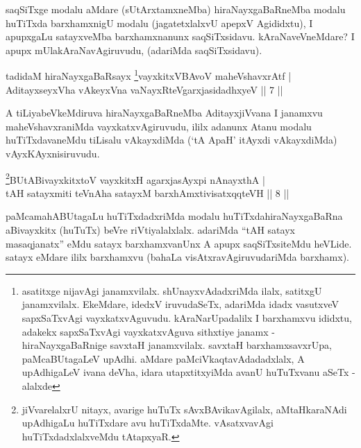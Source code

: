 \begin{artha}
saqSiTxge modalu aMdare (sUtArxtamxneMba) hiraNayxgaBaRneMba modalu huTiTxda barxhamxnigU modalu (jagatetxlalxvU apepxV Agididxtu), I apupxgaLu satayxveMba barxhamxnanunx saqSiTxsidavu. kAraNaveVneMdare? I apupx mUlakAraNavAgiruvudu, (adariMda saqSiTxsidavu).
\end{artha}


\begin{shl}
tadidaM hiraNayxgaBaRsayx \footnote{asatitxge nijavAgi janamxvilalx. shUnayxvAdadxriMda ilalx, satitxgU janamxvilalx. EkeMdare, idedxV iruvudaSeTx, adariMda idadx vasutxveV sapxSaTxvAgi vayxkatxvAguvudu. kAraNarUpadalilx I barxhamxvu ididxtu, adakekx sapxSaTxvAgi vayxkatxvAguva sithxtiye janamx - hiraNayxgaBaRnige savxtaH janamxvilalx. savxtaH barxhamxsavxrUpa, paMcaBUtagaLeV upAdhi. aMdare paMciVkaqtavAdadadxlalx, A upAdhigaLeV ivana deVha, idara utapxtitxyiMda avanU huTuTxvanu aSeTx - alalxde \mdash }vayxkitxVBAvoV maheVshavxrAtf | \\
AditayxseyxVha vAkeyxVna vaNayxRteV\s garxjasidadhxyeV \hfill ||  7 || 
\end{shl}

\begin{artha}
A tiLiyabeVkeMdiruva hiraNayxgaBaRneMba AditayxjiVvana I janamxvu maheVshavxraniMda vayxkatxvAgiruvudu, ililx adanunx Atanu modalu huTiTxdavaneMdu tiLisalu vAkayxdiMda (`tA ApaH' itAyxdi vAkayxdiMda) vAyxKAyxnisiruvudu.
\end{artha}


\begin{shl}
\footnote{jiVvarelalxrU nitayx, avarige huTuTx sAvxBAvikavAgilalx, aMtaHkaraNAdi upAdhigaLu huTiTxdare avu huTiTxdaMte. vAsatxvavAgi huTiTxdadxlalxveMdu tAtapxyaR.}BUtABivayxkitxtoV vayxkitxH agarxjasAyxpi nAnayxthA | \\
tAH satayxmiti teVnA\s \s ha satayxM barxhAmxtivisatxqqteVH \hfill ||  8 || 
\end{shl}

\begin{artha}
paMcamahABUtagaLu huTiTxdadxriMda modalu huTiTxda\break hiraNayxgaBaRna aBivayxkitx (huTuTx) beVre riVtiyalalxlalx. adariMda ``tAH satayx masaqjanatx'' eMdu satayx barxhamxvanUnx A apupx saqSiTxsiteMdu heVLide. satayx eMdare ililx barxhamxvu (bahaLa visAtxravAgiruvudariMda barxhamx).
\end{artha}



